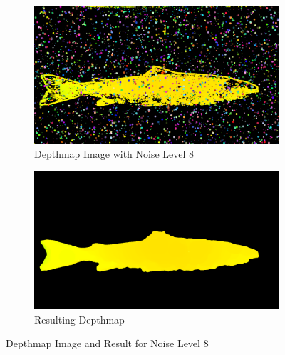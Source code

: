 \begin{figure}[H]
    \centering
    \begin{subfigure}{0.5\textwidth}
        \centering
        \includegraphics[width=.95\linewidth]{images/results/noise/noise63_8}
        \caption{Depthmap Image with Noise Level 8} 
        \label{fig:image_noise_level_8}
    \end{subfigure}%
    \begin{subfigure}{0.5\textwidth}
        \centering
        \includegraphics[width=.95\linewidth]{images/results/noise/filternoise63_8}
        \caption{Resulting Depthmap} 
        \label{fig:filter_noise_level_8}
    \end{subfigure}
    \caption{Depthmap Image and Result for Noise Level 8}
    \label{fig:noise_level_8}
\end{figure}

